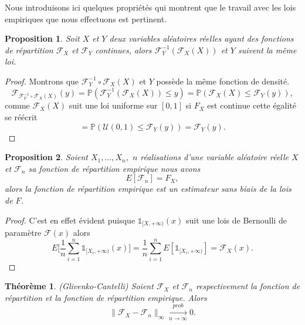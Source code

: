 \documentclass[a4paper,11pt]{article}
\numberwithin{equation}{section}
\newtheorem{theorem}{Théorème}[section]
\newtheorem{proposition}{Proposition}
\begin{document}
Nous introduisons ici quelques propriétés qui montrent que le travail avec les lois empiriques que nous effectuons est pertinent.
\begin{proposition}
	Soit $X$ et $Y$ deux variables aléatoires réelles ayant des fonctions de répartition $\mathcal{F}_{X}$ et $\mathcal{F}_{Y}$ continues, alors 
	$\mathcal{F}^{-1}_Y (\mathcal{F}_X(X))$ et $Y$ suivent la même loi. 
\end{proposition}
\begin{proof}
	Montrons que $\mathcal{F}^{-1}_Y \circ \mathcal{F}_X(X)$ et $Y$ possède la même fonction de densité. 
	\[\mathcal{F}_{\mathcal{F}^{-1}_Y \circ \mathcal{F}_X(X)}(y)
	= \mathbb{P}(\mathcal{F}^{-1}_Y (\mathcal{F}_X(X))\leq y )
	= \mathbb{P}(\mathcal{F}_{X}(X) \leq \mathcal{F}_Y(y)),\]
	comme $\mathcal{F}_{X}(X)$ suit une loi uniforme sur $[0,1]$ si $F_X$ est continue cette égalité se réécrit
	\[= \mathbb{P}(\mathcal{U}(0,1) \leq \mathcal{F}_Y(y))=\mathcal{F}_Y(y).\]
\end{proof}
\begin{proposition}
	\label{mean-rep-emp}
	Soient $X_1,...,X_n,$ $n$ réalisations d'une variable aléatoire réelle $X$ et $\mathcal{F}_{n}$ sa fonction de répartition empirique nous avons
	\[E[\mathcal{F}_n]=F_{X},\]
	alors la fonction de répartition empirique est un estimateur sans biais de la lois de $F$. 
\end{proposition}

\begin{proof}
	C'est en effet évident puisque $\mathds{1}_{[X, +\infty )}(x)$ suit une lois de Bernoulli de paramètre $\mathcal{F}(x)$ alors 
	\[E\Big[\frac{1}{n}\sum_{i=1}^{n}\mathds{1}_{[X_i, +\infty )}(x)\Big]= \frac{1}{n}\sum_{i=1}^{n}E[\mathds{1}_{[X_i, +\infty )}]=\mathcal{F}_{X}(x).\]
\end{proof}


\begin{theorem}(Glivenko-Cantelli)
	\label{th:glivenko}
	Soient $\mathcal{F}_{X}$ et $\mathcal{F}_{n}$ respectivement la fonction de répartition et la fonction de répartition empirique. Alors 
	\begin{equation}
		\|\mathcal{F}_{X}-\mathcal{F}_{n}\|_{\infty} \xrightarrow[n\to \infty]{prob} 0.
	\end{equation}
\end{theorem}
\end{document}
